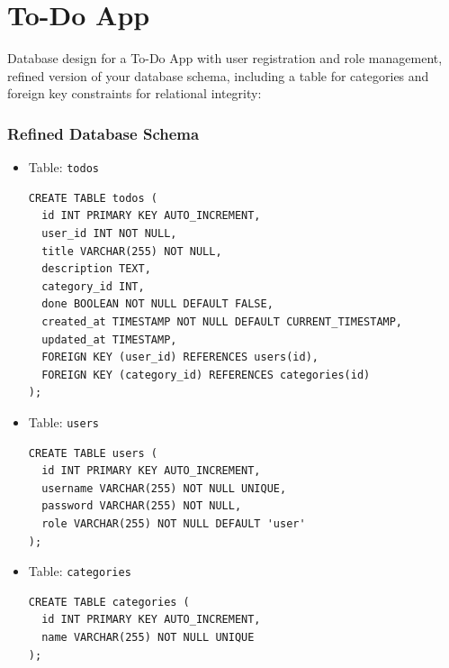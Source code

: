 \documentclass[11pt]{article}
\date{}
\title{}
\begin{document}
\setcounter{tocdepth}{3}
\tableofcontents

\setlength\parindent{10pt}


\section{To-Do App}
\label{sec:org99cd46c}
Database design for a To-Do App with user registration and role
management, refined version of your database schema, including a table for
categories and foreign key constraints for relational integrity:

\subsubsection{Refined Database Schema}
\label{sec:orga4bb73c}
\begin{itemize}
\item Table: \texttt{todos}
\label{sec:org0c4d9dd}
\begin{verbatim}
CREATE TABLE todos (
  id INT PRIMARY KEY AUTO_INCREMENT,
  user_id INT NOT NULL,
  title VARCHAR(255) NOT NULL,
  description TEXT,
  category_id INT,
  done BOOLEAN NOT NULL DEFAULT FALSE,
  created_at TIMESTAMP NOT NULL DEFAULT CURRENT_TIMESTAMP,
  updated_at TIMESTAMP,
  FOREIGN KEY (user_id) REFERENCES users(id),
  FOREIGN KEY (category_id) REFERENCES categories(id)
);
\end{verbatim}

\item Table: \texttt{users}
\label{sec:org3b9da34}
\begin{verbatim}
CREATE TABLE users (
  id INT PRIMARY KEY AUTO_INCREMENT,
  username VARCHAR(255) NOT NULL UNIQUE,
  password VARCHAR(255) NOT NULL,
  role VARCHAR(255) NOT NULL DEFAULT 'user'
);
\end{verbatim}

\item Table: \texttt{categories}
\label{sec:orgc53f2bb}
\begin{verbatim}
CREATE TABLE categories (
  id INT PRIMARY KEY AUTO_INCREMENT,
  name VARCHAR(255) NOT NULL UNIQUE
);
\end{verbatim}
\end{itemize}
\end{document}
